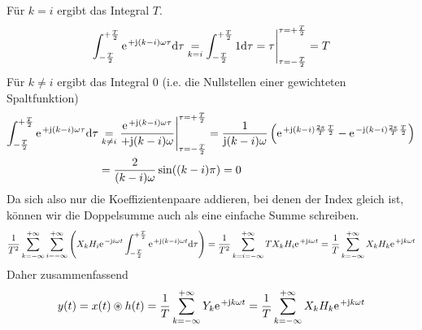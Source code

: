 \documentclass[11pt,a4paper,DIV=12]{scrartcl}
\begin{document}
Für $k=i$ ergibt das Integral $T$.
%
%
\begin{align}
	\int_{-\frac{T}{2}}^{+\frac{T}{2}}\e^{+\im (k-i)\omega \tau}\diff \tau \underset{k=i}{=}\int_{-\frac{T}{2}}^{+\frac{T}{2}}1\diff \tau =\tau \Bigg |_{\tau=-\frac{T}{2}}^{\tau=+\frac{T}{2}}=T
\end{align}
%
%
Für $k\neq i$ ergibt das Integral $0$ (i.e. die Nullstellen einer gewichteten Spaltfunktion)
%
%
\begin{align}
	\int_{-\frac{T}{2}}^{+\frac{T}{2}}\e^{+\im (k-i)\omega \tau}\diff \tau &\underset{k\neq i}{=}\frac{\e^{+\im (k-i)\omega \tau}}{+\im (k-i)\omega}\Bigg |_{\tau=-\frac{T}{2}}^{\tau=+\frac{T}{2}}
	=\frac{1}{\im (k-i)\omega }\left (\e^{+\im (k-i)\frac{2\pi}{T}\frac{T}{2}}-\e^{-\im (k-i)\frac{2\pi}{T}\frac{T}{2}}\right )\nonumber \\
	&=\frac{2}{ (k-i)\omega}\sin((k-i)\pi)=0
\end{align}
%
Da sich also nur die Koeffizientenpaare addieren, bei denen der Index gleich ist, können wir die Doppelsumme auch als eine einfache Summe schreiben.
%
%
\begin{align}
	\frac{1}{T^2}\sum_{k=-\infty}^{+\infty}\sum_{i=-\infty}^{+\infty}\left (X_kH_i\e^{-\im i \omega t}\int_{-\frac{T}{2}}^{+\frac{T}{2}}\e^{+\im (k-i)\omega t}\diff \tau \right )
	=\frac{1}{T^2}\sum_{k=i=-\infty}^{+\infty}TX_kH_i\e^{+\im i\omega t}
	=\frac{1}{T}\sum_{k=-\infty}^{+\infty}X_kH_k\e^{+\im k \omega t}
\end{align}
%
Daher zusammenfassend
\begin{align}
y(t) = x(t)\circledast h(t) = \frac{1}{T}\sum_{k=-\infty}^{+\infty} Y_k \e^{+\im k \omega t} = \frac{1}{T}\sum_{k=-\infty}^{+\infty}X_kH_k\e^{+\im k \omega t}
\end{align}
\end{document}
